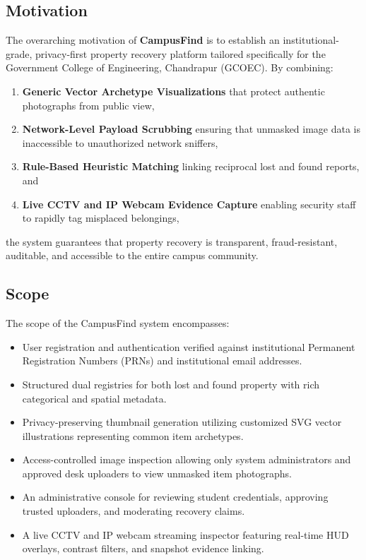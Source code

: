 \documentclass[11pt,a4paper]{article}
\begin{document}
\subsection{Motivation}
The overarching motivation of \textbf{CampusFind} is to establish an institutional-grade, privacy-first property recovery platform tailored specifically for the Government College of Engineering, Chandrapur (GCOEC). By combining:
\begin{enumerate}
    \item \textbf{Generic Vector Archetype Visualizations} that protect authentic photographs from public view,
    \item \textbf{Network-Level Payload Scrubbing} ensuring that unmasked image data is inaccessible to unauthorized network sniffers,
    \item \textbf{Rule-Based Heuristic Matching} linking reciprocal lost and found reports, and
    \item \textbf{Live CCTV and IP Webcam Evidence Capture} enabling security staff to rapidly tag misplaced belongings,
\end{enumerate}
the system guarantees that property recovery is transparent, fraud-resistant, auditable, and accessible to the entire campus community.

\subsection{Scope}
The scope of the CampusFind system encompasses:
\begin{itemize}
    \item User registration and authentication verified against institutional Permanent Registration Numbers (PRNs) and institutional email addresses.
    \item Structured dual registries for both lost and found property with rich categorical and spatial metadata.
    \item Privacy-preserving thumbnail generation utilizing customized SVG vector illustrations representing common item archetypes.
    \item Access-controlled image inspection allowing only system administrators and approved desk uploaders to view unmasked item photographs.
    \item An administrative console for reviewing student credentials, approving trusted uploaders, and moderating recovery claims.
    \item A live CCTV and IP webcam streaming inspector featuring real-time HUD overlays, contrast filters, and snapshot evidence linking.
\end{itemize}
\end{document}
